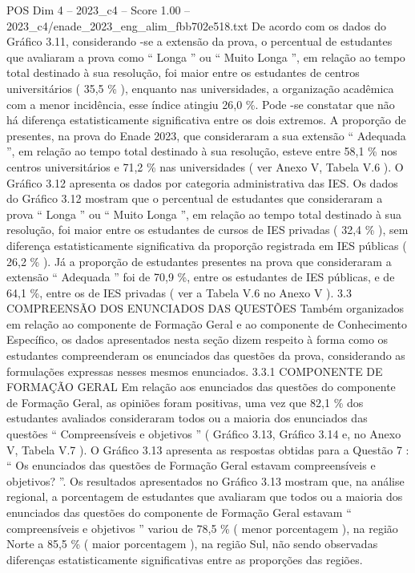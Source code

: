 \begin{textsample}{POS Dim 4 – 2023\_c4 – Score 1.00 – 2023\_c4/enade\_2023\_eng\_alim\_fbb702e518.txt}
De acordo com os dados do Gráfico 3.11, considerando -se a extensão da prova, o percentual de estudantes que avaliaram a prova como “ Longa ” ou “ Muito Longa ”, em relação ao tempo total destinado à sua resolução, foi maior entre os estudantes de centros universitários ( 35,5 \% ), enquanto nas universidades, a organização acadêmica com a menor incidência, esse índice atingiu 26,0 \%.
Pode -se constatar que não há diferença estatisticamente significativa entre os dois extremos.
A proporção de presentes, na prova do Enade 2023, que consideraram a sua extensão “ Adequada ”, em relação ao tempo total destinado à sua resolução, esteve entre 58,1 \% nos centros universitários e 71,2 \% nas universidades ( ver Anexo V, Tabela V.6 ).
O Gráfico 3.12 apresenta os dados por categoria administrativa das IES.
Os dados do Gráfico 3.12 mostram que o percentual de estudantes que consideraram a prova “ Longa ” ou “ Muito Longa ”, em relação ao tempo total destinado à sua resolução, foi maior entre os estudantes de cursos de IES privadas ( 32,4 \% ), sem diferença estatisticamente significativa da proporção registrada em IES públicas ( 26,2 \% ).
Já a proporção de estudantes presentes na prova que consideraram a extensão “ Adequada ” foi de 70,9 \%, entre os estudantes de IES públicas, e de 64,1 \%, entre os de IES privadas ( ver a Tabela V.6 no Anexo V ). 3.3 COMPREENSÃO DOS ENUNCIADOS DAS QUESTÕES Também organizados em relação ao componente de Formação Geral e ao componente de Conhecimento Específico, os dados apresentados nesta seção dizem respeito à forma como os estudantes compreenderam os enunciados das questões da prova, considerando as formulações expressas nesses mesmos enunciados. 3.3.1 COMPONENTE DE FORMAÇÃO GERAL Em relação aos enunciados das questões do componente de Formação Geral, as opiniões foram positivas, uma vez que 82,1 \% dos estudantes avaliados consideraram todos ou a maioria dos enunciados das questões “ Compreensíveis e objetivos ” ( Gráfico 3.13, Gráfico 3.14 e, no Anexo V, Tabela V.7 ).
O Gráfico 3.13 apresenta as respostas obtidas para a Questão 7 : “ Os enunciados das questões de Formação Geral estavam compreensíveis e objetivos? ”.
Os resultados apresentados no Gráfico 3.13 mostram que, na análise regional, a porcentagem de estudantes que avaliaram que todos ou a maioria dos enunciados das questões do componente de Formação Geral estavam “ compreensíveis e objetivos ” variou de 78,5 \% ( menor porcentagem ), na região Norte a 85,5 \% ( maior porcentagem ), na região Sul, não sendo observadas diferenças estatisticamente significativas entre as proporções das regiões.

\end{textsample}
